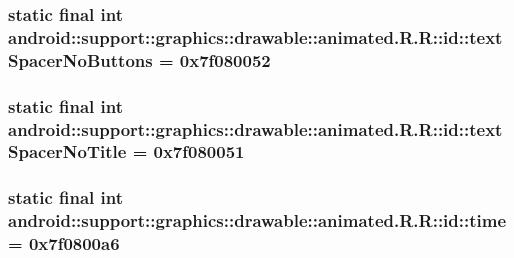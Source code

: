 \hypertarget{classandroid_1_1support_1_1graphics_1_1drawable_1_1animated_1_1_r_1_1id_daccde4db1a7c0d45c2aac33acb24103}{
\subsubsection[{textSpacerNoButtons}]{\setlength{\rightskip}{0pt plus 5cm}static final int android::support::graphics::drawable::animated.R.R::id::textSpacerNoButtons = 0x7f080052}}
\label{classandroid_1_1support_1_1graphics_1_1drawable_1_1animated_1_1_r_1_1id_daccde4db1a7c0d45c2aac33acb24103}


\hypertarget{classandroid_1_1support_1_1graphics_1_1drawable_1_1animated_1_1_r_1_1id_5e68be1b7e701422769031c18a082a80}{
\subsubsection[{textSpacerNoTitle}]{\setlength{\rightskip}{0pt plus 5cm}static final int android::support::graphics::drawable::animated.R.R::id::textSpacerNoTitle = 0x7f080051}}
\label{classandroid_1_1support_1_1graphics_1_1drawable_1_1animated_1_1_r_1_1id_5e68be1b7e701422769031c18a082a80}


\hypertarget{classandroid_1_1support_1_1graphics_1_1drawable_1_1animated_1_1_r_1_1id_d0105d8d2f220c019b5cbc2cd06005a2}{
\subsubsection[{time}]{\setlength{\rightskip}{0pt plus 5cm}static final int android::support::graphics::drawable::animated.R.R::id::time = 0x7f0800a6}}
\label{classandroid_1_1support_1_1graphics_1_1drawable_1_1animated_1_1_r_1_1id_d0105d8d2f220c019b5cbc2cd06005a2}


